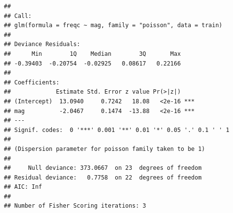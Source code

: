 \begin{verbatim}
## 
## Call:
## glm(formula = freqc ~ mag, family = "poisson", data = train)
## 
## Deviance Residuals: 
##      Min        1Q    Median        3Q       Max  
## -0.39403  -0.20754  -0.02925   0.08617   0.22166  
## 
## Coefficients:
##             Estimate Std. Error z value Pr(>|z|)    
## (Intercept)  13.0940     0.7242   18.08   <2e-16 ***
## mag          -2.0467     0.1474  -13.88   <2e-16 ***
## ---
## Signif. codes:  0 '***' 0.001 '**' 0.01 '*' 0.05 '.' 0.1 ' ' 1
## 
## (Dispersion parameter for poisson family taken to be 1)
## 
##     Null deviance: 373.0667  on 23  degrees of freedom
## Residual deviance:   0.7758  on 22  degrees of freedom
## AIC: Inf
## 
## Number of Fisher Scoring iterations: 3
\end{verbatim}

